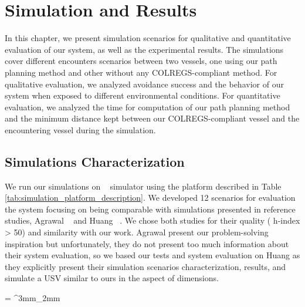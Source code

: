 \chapter{Simulation and Results}
\label{chap:5_Simulation_And_Results}
        
    In this chapter, we present simulation scenarios for qualitative and quantitative evaluation of our system, as well as the experimental results. The simulations cover different encounters scenarios between two vessels, one using our path planning method and other without any COLREGS-compliant method. For qualitative evaluation, we analyzed avoidance success and the behavior of our system when exposed to different environmental conditions. For quantitative evaluation, we analyzed the time for computation of our path planning method and the minimum distance kept between our COLREGS-compliant vessel and the encountering vessel during the simulation.

    \section{Simulations Characterization}

    We run our simulations on \usvsim ~\cite{Paravisi2018Toward} simulator using the platform described in Table \ref{tab:simulation_platform_description}. 
    We developed 12 scenarios for evaluation the system focusing on being comparable with simulations presented in reference studies, \ie{} Agrawal \etal{} ~\cite{Agrawal2015COLREGS} and Huang \etal{} ~\cite{Huang2019Generalized}. We chose both studies for their quality (\ie{} h-index > 50) and similarity with our work. Agrawal \etal{} present our problem-solving inspiration but unfortunately, they do not present too much information about their system evaluation, so we based our tests and system evaluation on Huang \etal{} as they explicitly present their simulation scenarios characterization, results, and simulate a \ac{USV} similar to ours in the aspect of dimensions.
    
    \tabulinesep = ^3mm_2mm
    \everyrow{\tabucline[.4mm  white]{}}

